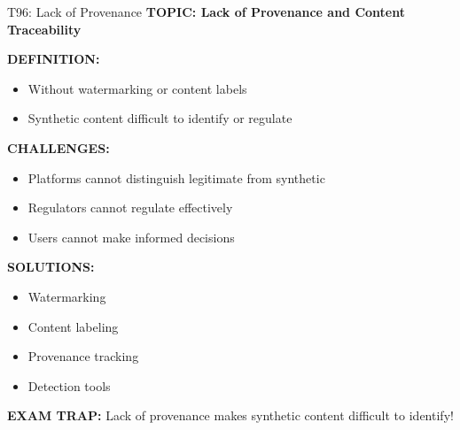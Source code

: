 \documentclass[8pt]{beamer}
\begin{document}
	\begin{frame}{T96: Lack of Provenance}
		\fontsize{6.5}{7.5}\selectfont
		\textbf{TOPIC: Lack of Provenance and Content Traceability}
		
		\vspace{0.1cm}
		\textbf{DEFINITION:}
		\begin{itemize}
			\item Without watermarking or content labels
			\item Synthetic content difficult to identify or regulate
		\end{itemize}
		
		\vspace{0.1cm}
		\textbf{CHALLENGES:}
		\begin{itemize}
			\item Platforms cannot distinguish legitimate from synthetic
			\item Regulators cannot regulate effectively
			\item Users cannot make informed decisions
		\end{itemize}
		
		\vspace{0.1cm}
		\textbf{SOLUTIONS:}
		\begin{itemize}
			\item Watermarking
			\item Content labeling
			\item Provenance tracking
			\item Detection tools
		\end{itemize}
		
		\textcolor{myred}{\textbf{EXAM TRAP:}} Lack of provenance makes \textcolor{myblue}{synthetic content difficult to identify}!
	\end{frame}
	
\end{document}
